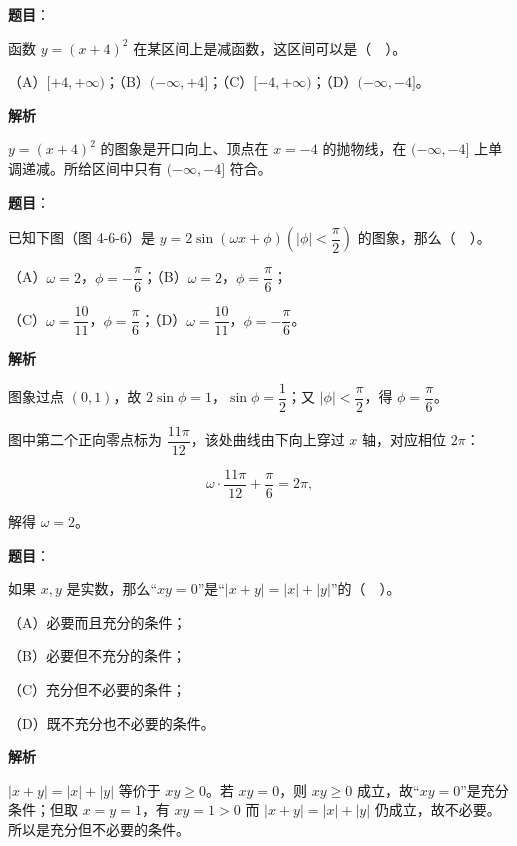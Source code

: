 \begin{answer}

\textbf{题目}：

函数 $y=(x+4)^2$ 在某区间上是减函数，这区间可以是（　）。

（A）$[+4,+\infty)$；（B）$(-\infty,+4]$；（C）$[-4,+\infty)$；（D）$(-\infty,-4]$。

\textbf{解析}

$y=(x+4)^2$ 的图象是开口向上、顶点在 $x=-4$ 的抛物线，在 $(-\infty,-4]$ 上单调递减。所给区间中只有 $(-\infty,-4]$ 符合。


\end{answer}
\begin{answer}

\textbf{题目}：

已知下图（图 4-6-6）是 $y=2\sin(\omega x+\phi)\left(|\phi|<\dfrac{\pi}{2}\right)$ 的图象，那么（　）。

（A）$\omega=2$，$\phi=-\dfrac{\pi}{6}$；（B）$\omega=2$，$\phi=\dfrac{\pi}{6}$；

（C）$\omega=\dfrac{10}{11}$，$\phi=\dfrac{\pi}{6}$；（D）$\omega=\dfrac{10}{11}$，$\phi=-\dfrac{\pi}{6}$。
\nopagebreak[4]
\begin{center}\end{center}
\nopagebreak[4]
\textbf{解析}

图象过点 $(0,1)$，故 $2\sin\phi=1$，$\sin\phi=\dfrac12$；又 $|\phi|<\dfrac{\pi}{2}$，得 $\phi=\dfrac{\pi}{6}$。

图中第二个正向零点标为 $\dfrac{11\pi}{12}$，该处曲线由下向上穿过 $x$ 轴，对应相位 $2\pi$：

\nopagebreak[4]
\[
\omega\cdot\frac{11\pi}{12}+\frac{\pi}{6}=2\pi,
\]

解得 $\omega=2$。


\end{answer}
\begin{answer}

\textbf{题目}：

如果 $x,y$ 是实数，那么“$xy=0$”是“$|x+y|=|x|+|y|$”的（　）。

（A）必要而且充分的条件；

（B）必要但不充分的条件；

（C）充分但不必要的条件；

（D）既不充分也不必要的条件。

\textbf{解析}

$|x+y|=|x|+|y|$ 等价于 $xy\ge 0$。若 $xy=0$，则 $xy\ge0$ 成立，故“$xy=0$”是充分条件；但取 $x=y=1$，有 $xy=1>0$ 而 $|x+y|=|x|+|y|$ 仍成立，故不必要。所以是充分但不必要的条件。


\end{answer}
